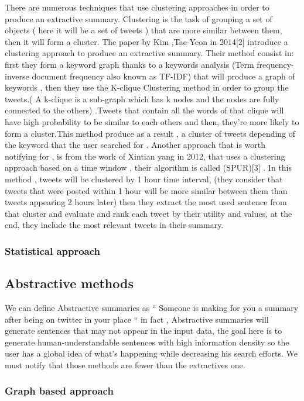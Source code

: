 \documentclass[a4paper, twocolumn]{article}
\begin{document}
There are numerous techniques that use clustering approaches in order to
produce an extractive summary. Clustering is the task of grouping a set of
objects ( here it will be a set of tweets ) that are more similar between them,
then it will  form a cluster.
The paper by Kim ,Tae-Yeon in 2014[2] introduce a clustering approach to
produce an extractive summary. Their method consist in:  first they form a
keyword graph thanks to a keywords analysis (Term frequency-inverse document
frequency also known as TF-IDF) that will produce a graph of keywords , then
they use the K-clique Clustering method in order to group the tweets.( A
k-clique is a sub-graph which has k nodes and the nodes are fully connected to
the others) .Tweets that contain all the words of that clique will have high
probability to be similar to each others and then, they’re more likely to form
a cluster.This method produce as a result , a cluster of tweets depending of
the keyword that the user searched for . Another approach that is worth
notifying for , is from the work of Xintian yang in 2012, that uses a
clustering approach based on a time window , their algorithm is called
(SPUR)[3] . In this method , tweets will be clustered by 1 hour time interval,
(they consider that tweets that were posted within 1 hour will be more similar
between them than tweets appearing 2 hours later) then  they extract the most
used sentence from that cluster and evaluate and rank each tweet by their
utility and values, at the end, they include the most relevant tweets in their
summary.


\subsubsection{Statistical approach}

\subsection{Abstractive methods}

We can define Abstractive summaries as “ Someone is making for you a summary
after being on twitter in your place “ in fact , Abstractive summaries will
generate sentences that may not appear in the input data, the goal here is to
generate human-understandable sentences with high information density so the
user has a global idea of what’s happening while decreasing his search efforts.
We must notify that those methods are fewer than the extractives one.

\subsubsection{Graph based approach}
\end{document}
